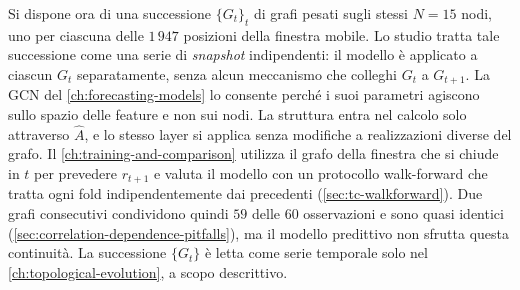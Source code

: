 Si dispone ora di una successione $\{G_t\}_t$ di grafi pesati sugli stessi $N=15$ nodi, uno per ciascuna delle $1\,947$ posizioni della finestra mobile. Lo studio tratta tale successione come una serie di \emph{snapshot} indipendenti: il modello è applicato a ciascun $G_t$ separatamente, senza alcun meccanismo che colleghi $G_t$ a $G_{t+1}$. La GCN del \cref{ch:forecasting-models} lo consente perché i suoi parametri agiscono sullo spazio delle feature e non sui nodi. La struttura entra nel calcolo solo attraverso $\hat A$, e lo stesso layer si applica senza modifiche a realizzazioni diverse del grafo. Il \cref{ch:training-and-comparison} utilizza il grafo della finestra che si chiude in $t$ per prevedere $r_{t+1}$ e valuta il modello con un protocollo walk-forward che tratta ogni fold indipendentemente dai precedenti (\cref{sec:tc-walkforward}). Due grafi consecutivi condividono quindi $59$ delle $60$ osservazioni e sono quasi identici (\cref{sec:correlation-dependence-pitfalls}), ma il modello predittivo non sfrutta questa continuità. La successione $\{G_t\}$ è letta come serie temporale solo nel \cref{ch:topological-evolution}, a scopo descrittivo.
